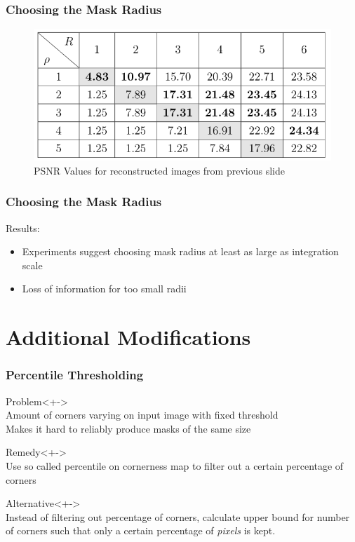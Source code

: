 \documentclass{beamer}
\begin{document}
    \begin{frame}
        \frametitle{Choosing the Mask Radius}
        \begin{figure}[htpb]
            \centering
            \includegraphics[width=0.7\linewidth]{images/psnr_mask.png}
            \caption{PSNR Values for reconstructed images from previous slide}
        \end{figure} 
    \end{frame}

    \begin{frame}[t]
        \frametitle{Choosing the Mask Radius}
        Results:
        \begin{itemize}[<+-|alert@+>]
            \item Experiments suggest choosing mask radius at least as large as integration
                scale
            \item Loss of information for too small radii
        \end{itemize}
    \end{frame}

    \section{Additional Modifications}
    \begin{frame}[t]
        \frametitle{Percentile Thresholding}
        \begin{block}{Problem}<+->\ \\
            Amount of corners varying on input image with fixed threshold\\
            Makes it hard to reliably produce masks of the same size
        \end{block}
        \begin{block}{Remedy}<+->\ \\
            Use so called percentile on cornerness map to filter out a certain percentage of
            corners
        \end{block}
        \begin{block}{Alternative}<+->\ \\
            Instead of filtering out percentage of corners, calculate upper bound for number of
            corners such that only a certain percentage of \textit{pixels} is kept.
        \end{block}
    \end{frame}  
\end{document}
